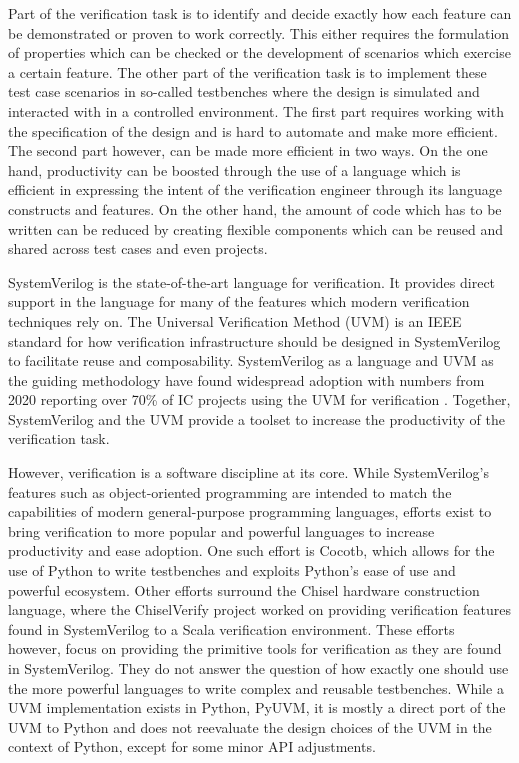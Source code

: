 Part of the verification task is to identify and decide exactly how each feature can be demonstrated or proven to work correctly. This either requires the formulation of properties which can be checked or the development of scenarios which exercise a certain feature. The other part of the verification task is to implement these test case scenarios in so-called testbenches where the design is simulated and interacted with in a controlled environment. The first part requires working with the specification of the design and is hard to automate and make more efficient. The second part however, can be made more efficient in two ways. On the one hand, productivity can be boosted through the use of a language which is efficient in expressing the intent of the verification engineer through its language constructs and features. On the other hand, the amount of code which has to be written can be reduced by creating flexible components which can be reused and shared across test cases and even projects.

SystemVerilog is the state-of-the-art language for verification. It provides direct support in the language for many of the features which modern verification techniques rely on. The Universal Verification Method (UVM) is an IEEE standard for how verification infrastructure should be designed in SystemVerilog to facilitate reuse and composability. SystemVerilog as a language and UVM as the guiding methodology have found widespread adoption with numbers from 2020 reporting over 70\% of IC projects using the UVM for verification \cite{foster2020wilson}. Together, SystemVerilog and the UVM provide a toolset to increase the productivity of the verification task.

However, verification is a software discipline at its core. While SystemVerilog's features such as object-oriented programming are intended to match the capabilities of modern general-purpose programming languages, efforts exist to bring verification to more popular and powerful languages to increase productivity and ease adoption. One such effort is Cocotb, which allows for the use of Python to write testbenches and exploits Python's ease of use and powerful ecosystem. Other efforts surround the Chisel hardware construction language, where the ChiselVerify project worked on providing verification features found in SystemVerilog to a Scala verification environment. These efforts however, focus on providing the primitive tools for verification as they are found in SystemVerilog. They do not answer the question of how exactly one should use the more powerful languages to write complex and reusable testbenches. While a UVM implementation exists in Python, PyUVM, it is mostly a direct port of the UVM to Python and does not reevaluate the design choices of the UVM in the context of Python, except for some minor API adjustments.

